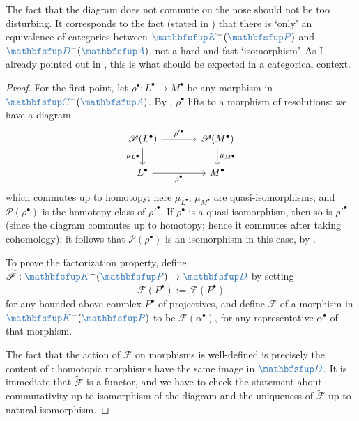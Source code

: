 The fact that the diagram does not commute on the nose should not be
too disturbing. It corresponds to the fact (stated in
) that there is `only' an equivalence of
categories between $\categ{K}^-(\categ{P})$ and
$\categ{D}^-(\categ{A})$, not a hard and fast `isomorphism'. As I
already pointed out in
, this is what should
be expected in a categorical context.
\begin{proof}
  For the first point, let $\rho^\bullet : L^\bullet \to M^\bullet$ be
  any morphism in $\categ{C}^-(\categ{A})$. By
  , $\rho^\bullet$ lifts to a morphism of
  resolutions: we have a diagram
  \[\begin{tikzcd}[column sep=large]
      \mathscr{P}(L^\bullet) \arrow[r, "\rho'^\bullet"] \arrow[d,
      "\mu_{L^\bullet}"'] & \mathscr{P}(M^\bullet)
      \arrow[d, "\mu_{M^\bullet}"] \\
      L^\bullet \arrow[r, "\rho^\bullet"'] & M^\bullet
    \end{tikzcd}\] which commutes up to homotopy; here
  $\mu_{L^\bullet}$, $\mu_{M^\bullet}$ are quasi-isomorphisms, and
  $\mathscr{P}(\rho^\bullet)$ is the homotopy class of
  $\rho'^\bullet$.  If $\rho^\bullet$ is a quasi-isomorphism, then so
  is $\rho'^\bullet$ (since the diagram commutes up to homotopy; hence
  it commutes after taking cohomology); it follows that
  $\mathscr{P}(\rho^\bullet)$ is an isomorphism in this case, by
  .

  To prove the factorization property, define
  $\widetilde{\mathscr{F}} : \categ{K}^-(\categ{P}) \to \categ{D}$ by
  setting
  \[
    \widetilde{\mathscr{F}}(P^\bullet) := \mathscr{F}(P^\bullet)
  \]
  for any bounded-above complex $P^\bullet$ of projectives, and define
  $\widetilde{\mathscr{F}}$ of a morphism in $\categ{K}^-(\categ{P})$
  to be $\mathscr{F}(\alpha^\bullet)$, for any representative
  $\alpha^\bullet$ of that morphism.

  The fact that the action of $\widetilde{\mathscr{F}}$ on morphisms
  is well-defined is precisely the content of
  : homotopic morphisms have the same image
  in $\categ{D}$. It is immediate that $\widetilde{\mathscr{F}}$ is a
  functor, and we have to check the statement about commutativity up
  to isomorphism of the diagram and the uniqueness of
  $\widetilde{\mathscr{F}}$ up to natural isomorphism.


\end{proof}
